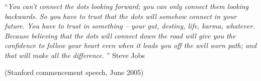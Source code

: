 
\vspace*{0.2\textheight}







\noindent\enquote{\itshape You can’t connect the dots looking forward; you can only connect them looking backwards. So you have to trust that the dots will somehow connect in your future. You have to trust in something – your gut, destiny, life, karma, whatever. Because believing that the dots will connect down the road will give you the confidence to follow your heart even when it leads you off the well worn path; and that will make all the difference.
}\bigbreak
\hfill{Steve Jobs} \newline 
\strut\hfill{\tiny{(Stanford commencement speech, June 2005)}}

